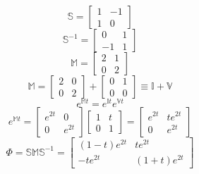 \documentclass[10pt]{article}
\begin{document}
\[
  \mathbb{S}      = \left[ \begin{array}{cc}1 & -1 \\ 1 & 0 \end{array} \right]
\]
\[
  \mathbb{S}^{-1} = \left[ \begin{array}{cc}0 & 1 \\ -1 & 1 \end{array} \right]
\]
\[
  \mathbb{M} = \left[ \begin{array}{cc} 2 & 1 \\ 0 & 2 \end{array} \right]
\]
\[
  \mathbb{M}  =       
         \left[ \begin{array}{cc} 2 & 0 \\ 0 & 2 \end{array} \right] 
       + \left[ \begin{array}{cc} 0 & 1 \\ 0 & 0 \end{array} \right]
     \equiv   
         \mathbb{I} + \mathbb{V}   
\]
\[
  e^{\mathbb{M}t} = e^{\mathbb{I}t} e^{\mathbb{V}t} 
\]
\[
  e^{\mathbb{M}t} =  
            \left[ \begin{array}{cc} e^{2t}   & 0          \\ 0 & e^{2 t} \end{array} \right]
            \left[ \begin{array}{cc}        1 & t          \\ 0 & 1       \end{array} \right]
          = \left[ \begin{array}{cc} e^{2t}   & t e^{2 t}  \\ 0 & e^{2 t} \end{array} \right]
\]
\[
  \Phi = \mathbb{S} \mathbb{M} \mathbb{S}^{-1} 
       = \left[ \begin{array}{cc} (1-t) e^{2t} & t e^{2t} \\ -t e^{2 t} & (1+t) e^{2t} \end{array} \right]
\]
\end{document}
